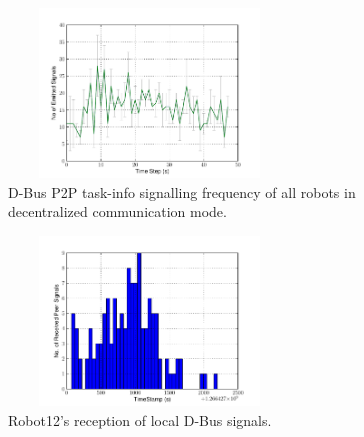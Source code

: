 \documentclass{ifacconf}
\begin{document}
\begin{figure}
\begin{center}
\includegraphics[width=7.5cm,height=4.5cm]{./images/Local-500cm-SignalingFreqStat}    %
\caption{D-Bus P2P task-info signalling frequency of all robots in decentralized communication mode.} 
\label{fig:local-freq}
\end{center}
\end{figure}
\begin{figure}
\begin{center}
\includegraphics[width=7.5cm,height=4.5cm]{./images/Robot12-17feb-3-LocalSignals}
\caption{Robot12's reception of local D-Bus signals.} 
\label{fig:robot-freq}
\end{center}
\end{figure}
\end{document}
